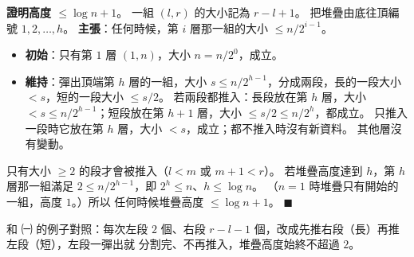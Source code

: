 \begin{pastsoln}
\textbf{證明高度 $\le \log n + 1$}。 一組 $(l, r)$ 的大小記為 $r - l + 1$。 把堆疊由底往頂編號 $1, 2, \ldots, h$。
\textbf{主張}：任何時候，第 $i$ 層那一組的大小 $\le n / 2^{i-1}$。

\begin{itemize}
\item \textbf{初始}：只有第 $1$ 層 $(1, n)$，大小 $n = n/2^0$，成立。
\item \textbf{維持}：彈出頂端第 $h$ 層的一組，大小 $s \le n/2^{h-1}$，分成兩段，長的一段大小 $< s$，短的一段大小
$\le s/2$。 若兩段都推入：長段放在第 $h$ 層，大小 $< s \le n/2^{h-1}$；短段放在第 $h+1$ 層，大小
$\le s/2 \le n/2^{h}$，都成立。 只推入一段時它放在第 $h$ 層，大小 $< s$，成立；都不推入時沒有新資料。
其他層沒有變動。
\end{itemize}

只有大小 $\ge 2$ 的段才會被推入（$l < m$ 或 $m + 1 < r$）。 若堆疊高度達到 $h$，第 $h$ 層那一組滿足
$2 \le n / 2^{h-1}$，即 $2^{h} \le n$、$h \le \log n$。 （$n = 1$ 時堆疊只有開始的一組，高度 $1$。）所以
任何時候堆疊高度 $\le \log n + 1$。 \hfill$\blacksquare$

和 ㈠ 的例子對照：每次左段 $2$ 個、右段 $r - l - 1$ 個，改成先推右段（長）再推左段（短），左段一彈出就
分割完、不再推入，堆疊高度始終不超過 $2$。
\end{pastsoln}
